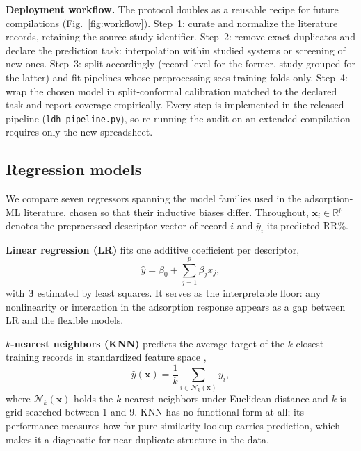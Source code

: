 \textbf{Deployment workflow.} The protocol doubles as a reusable recipe
for future compilations (Fig.~\ref{fig:workflow}). Step~1: curate and
normalize the literature records, retaining the source-study identifier.
Step~2: remove exact duplicates and declare the prediction task:
interpolation within studied systems or screening of new ones.
Step~3: split accordingly (record-level for the former, study-grouped
for the latter) and fit pipelines whose preprocessing sees training
folds only. Step~4: wrap the chosen model in split-conformal
calibration matched to the declared task and report coverage
empirically. Every step is implemented in the released pipeline
(\texttt{ldh\_pipeline.py}), so re-running the audit on an extended
compilation requires only the new spreadsheet.

\subsection{Regression models}
\label{sec:models}

We compare seven regressors spanning the model families used in the
adsorption-ML literature, chosen so that their inductive biases differ.
Throughout, $\mathbf{x}_i \in \mathbb{R}^{p}$ denotes the preprocessed
descriptor vector of record $i$ and $\hat{y}_i$ its predicted RR\%.

\textbf{Linear regression (LR)} fits one additive coefficient per
descriptor,
\begin{equation}
\hat{y} = \beta_0 + \sum_{j=1}^{p} \beta_j x_j ,
\label{eq:lr}
\end{equation}
with $\boldsymbol{\beta}$ estimated by least squares. It serves as the
interpretable floor: any nonlinearity or interaction in the adsorption
response appears as a gap between LR and the flexible models.

\textbf{$k$-nearest neighbors (KNN)} predicts the average target of the
$k$ closest training records in standardized feature space
\citep{cover1967knn},
\begin{equation}
\hat{y}(\mathbf{x}) = \frac{1}{k}\sum_{i \in \mathcal{N}_k(\mathbf{x})} y_i ,
\label{eq:knn}
\end{equation}
where $\mathcal{N}_k(\mathbf{x})$ holds the $k$ nearest neighbors under
Euclidean distance and $k$ is grid-searched between 1 and 9. KNN has no
functional form at all; its performance measures how far pure similarity
lookup carries prediction, which makes it a diagnostic for
near-duplicate structure in the data.

